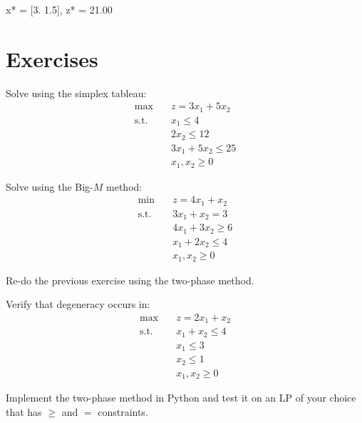 \begin{codeoutput}
x* = [3.  1.5], z* = 21.00
\end{codeoutput}

\section{Exercises}

\begin{exercise}
Solve using the simplex tableau:
\[
\begin{aligned}
  \max \quad & z = 3x_1 + 5x_2 \\
  \text{s.t.} \quad
    & x_1 \le 4 \\
    & 2x_2 \le 12 \\
    & 3x_1 + 5x_2 \le 25 \\
    & x_1, x_2 \ge 0
\end{aligned}
\]
\end{exercise}

\begin{exercise}
Solve using the Big-$M$ method:
\[
\begin{aligned}
  \min \quad & z = 4x_1 + x_2 \\
  \text{s.t.} \quad
    & 3x_1 + x_2 = 3 \\
    & 4x_1 + 3x_2 \ge 6 \\
    & x_1 + 2x_2 \le 4 \\
    & x_1, x_2 \ge 0
\end{aligned}
\]
\end{exercise}

\begin{exercise}
Re-do the previous exercise using the two-phase method.
\end{exercise}

\begin{exercise}
Verify that degeneracy occurs in:
\[
\begin{aligned}
  \max \quad & z = 2x_1 + x_2 \\
  \text{s.t.} \quad
    & x_1 + x_2 \le 4 \\
    & x_1 \le 3 \\
    & x_2 \le 1 \\
    & x_1, x_2 \ge 0
\end{aligned}
\]
\end{exercise}

\begin{exercise}
Implement the two-phase method in Python and test it on an LP of your choice
that has $\ge$ and $=$ constraints.
\end{exercise}
